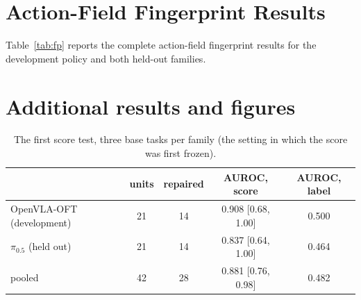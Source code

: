 \documentclass{article}
\begin{document}
\section{Action-Field Fingerprint Results}

\label{app:fingerprint}

Table~\ref{tab:fp} reports the complete action-field fingerprint results for the development policy and both held-out
families.

\begin{table}[t]
\centering\small
\caption{Action-field fingerprint results. All constants were fixed on OFT before held-out evaluation.}
\label{tab:fp}
\end{table}

\section{Additional results and figures}
\label{app:extra}
\begin{table}[h]
\centering\small
\caption{The first score test, three base tasks per family (the setting in which the score was first frozen).}
\begin{tabular}{lcccc}
\toprule
& units & repaired & AUROC, score & AUROC, label \\
\midrule
OpenVLA-OFT (development) & 21 & 14 & 0.908 [0.68, 1.00] & 0.500 \\
$\pi_{0.5}$ (held out) & 21 & 14 & 0.837 [0.64, 1.00] & 0.464 \\
pooled & 42 & 28 & 0.881 [0.76, 0.98] & 0.482 \\
\bottomrule
\end{tabular}
\end{table}
\end{document}
